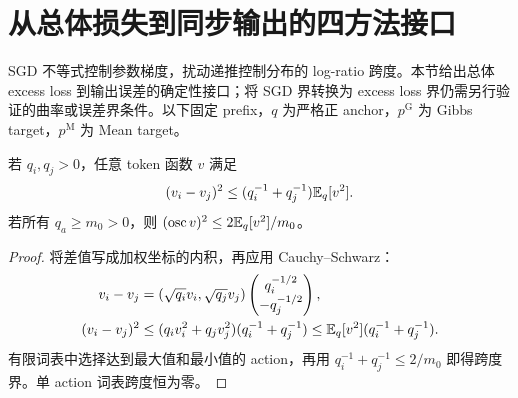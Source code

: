 \section{从总体损失到同步输出的四方法接口}
\label{dyn:bridges}

SGD 不等式控制参数梯度，扰动递推控制分布的 log-ratio 跨度。本节给出总体 excess loss 到输出误差的确定性接口；将 SGD 界转换为 excess loss 界仍需另行验证的曲率或误差界条件。以下固定 prefix，$q$ 为严格正 anchor，$p^{\mathrm G}$ 为 Gibbs target，$p^{\mathrm M}$ 为 Mean target。

\begin{lemma}[加权平方控制动作间的差值]
\label{dyn:contrast}
若 $q_i,q_j>0$，任意 token 函数 $v$ 满足
\begin{equation}
(v_i-v_j)^2\le(q_i^{-1}+q_j^{-1})\mathbb E_q[v^2].
\end{equation}
若所有 $q_a\ge m_0>0$，则 $(\operatorname{osc}v)^2\le2\mathbb E_q[v^2]/m_0$。
\end{lemma}
\begin{proof}
将差值写成加权坐标的内积，再应用 Cauchy--Schwarz：
\begin{align*}
v_i-v_j&=(\sqrt{q_i}v_i,\sqrt{q_j}v_j)
\begin{pmatrix}q_i^{-1/2}\\-q_j^{-1/2}\end{pmatrix},\\
(v_i-v_j)^2&\le(q_iv_i^2+q_jv_j^2)(q_i^{-1}+q_j^{-1})
\le\mathbb E_q[v^2](q_i^{-1}+q_j^{-1}).
\end{align*}
有限词表中选择达到最大值和最小值的 action，再用 $q_i^{-1}+q_j^{-1}\le2/m_0$ 即得跨度界。单 action 词表跨度恒为零。
\end{proof}

